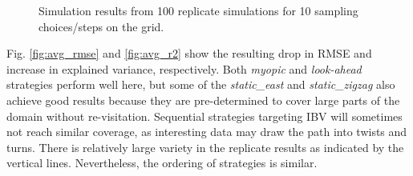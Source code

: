 \documentclass[aoas]{imsart}
\begin{document}
\begin{figure}[h!]
\caption{Simulation results from 100 replicate simulations for 10
  sampling choices/steps on the grid.} 
\label{fig:sim_results}
\end{figure}

Fig. \ref{fig:avg_rmse} and \ref{fig:avg_r2} show the resulting drop
in RMSE and increase in explained variance, respectively. Both
\textit{myopic} and \textit{look-ahead} strategies perform well here,
but some of the \textit{static\_east} and \textit{static\_zigzag} also
achieve good results because they are pre-determined to cover large
parts of the domain without re-visitation. Sequential strategies
targeting IBV will sometimes not reach similar coverage, as
interesting data may draw the path into twists and turns. There is
relatively large variety in the replicate results as indicated by the
vertical lines. Nevertheless, the ordering of strategies is similar.
\end{document}
